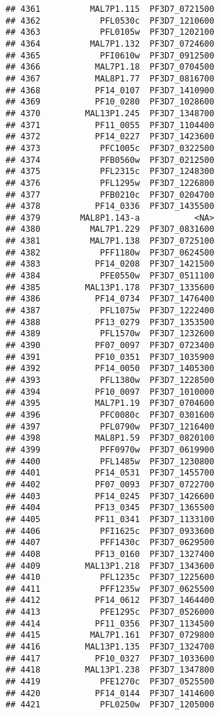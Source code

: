 \documentclass[12pt, a4paper]{article}\usepackage[]{graphicx}\usepackage[]{color}
\makeatletter
\newenvironment{kframe}{%
 \def\at@end@of@kframe{}%
 \ifinner\ifhmode%
  \def\at@end@of@kframe{\end{minipage}}%
  \begin{minipage}{\columnwidth}%
 \fi\fi%
 \def\FrameCommand##1{\hskip\@totalleftmargin \hskip-\fboxsep
 \colorbox{shadecolor}{##1}\hskip-\fboxsep
     \hskip-\linewidth \hskip-\@totalleftmargin \hskip\columnwidth}%
 \MakeFramed {\advance\hsize-\width
   \@totalleftmargin\z@ \linewidth\hsize
   \@setminipage}}%
 {\par\unskip\endMakeFramed%
 \at@end@of@kframe}
\newenvironment{knitrout}{}{} %
\makeatother
\begin{document}
\begin{knitrout}
\begin{kframe}
\begin{verbatim}
## 4361          MAL7P1.115  PF3D7_0721500
## 4362            PFL0530c  PF3D7_1210600
## 4363            PFL0105w  PF3D7_1202100
## 4364          MAL7P1.132  PF3D7_0724600
## 4365            PFI0610w  PF3D7_0912500
## 4366           MAL7P1.18  PF3D7_0704500
## 4367           MAL8P1.77  PF3D7_0816700
## 4368           PF14_0107  PF3D7_1410900
## 4369           PF10_0280  PF3D7_1028600
## 4370         MAL13P1.245  PF3D7_1348700
## 4371           PF11_0055  PF3D7_1104400
## 4372           PF14_0227  PF3D7_1423600
## 4373            PFC1005c  PF3D7_0322500
## 4374            PFB0560w  PF3D7_0212500
## 4375            PFL2315c  PF3D7_1248300
## 4376            PFL1295w  PF3D7_1226800
## 4377            PFB0210c  PF3D7_0204700
## 4378           PF14_0336  PF3D7_1435500
## 4379        MAL8P1.143-a           <NA>
## 4380          MAL7P1.229  PF3D7_0831600
## 4381          MAL7P1.138  PF3D7_0725100
## 4382            PFF1180w  PF3D7_0624500
## 4383           PF14_0208  PF3D7_1421500
## 4384            PFE0550w  PF3D7_0511100
## 4385         MAL13P1.178  PF3D7_1335600
## 4386           PF14_0734  PF3D7_1476400
## 4387            PFL1075w  PF3D7_1222400
## 4388           PF13_0279  PF3D7_1353500
## 4389            PFL1570w  PF3D7_1232600
## 4390           PF07_0097  PF3D7_0723400
## 4391           PF10_0351  PF3D7_1035900
## 4392           PF14_0050  PF3D7_1405300
## 4393            PFL1380w  PF3D7_1228500
## 4394           PF10_0097  PF3D7_1010000
## 4395           MAL7P1.19  PF3D7_0704600
## 4396            PFC0080c  PF3D7_0301600
## 4397            PFL0790w  PF3D7_1216400
## 4398           MAL8P1.59  PF3D7_0820100
## 4399            PFF0970w  PF3D7_0619900
## 4400            PFL1485w  PF3D7_1230800
## 4401           PF14_0531  PF3D7_1455700
## 4402           PF07_0093  PF3D7_0722700
## 4403           PF14_0245  PF3D7_1426600
## 4404           PF13_0345  PF3D7_1365500
## 4405           PF11_0341  PF3D7_1133100
## 4406            PFI1625c  PF3D7_0933600
## 4407            PFF1430c  PF3D7_0629500
## 4408           PF13_0160  PF3D7_1327400
## 4409         MAL13P1.218  PF3D7_1343600
## 4410            PFL1235c  PF3D7_1225600
## 4411            PFF1235w  PF3D7_0625500
## 4412           PF14_0612  PF3D7_1464400
## 4413            PFE1295c  PF3D7_0526000
## 4414           PF11_0356  PF3D7_1134500
## 4415          MAL7P1.161  PF3D7_0729800
## 4416         MAL13P1.135  PF3D7_1324700
## 4417           PF10_0327  PF3D7_1033600
## 4418         MAL13P1.238  PF3D7_1347800
## 4419            PFE1270c  PF3D7_0525500
## 4420           PF14_0144  PF3D7_1414600
## 4421            PFL0250w  PF3D7_1205000

\end{verbatim}
\end{kframe}
\end{knitrout}
\end{document}
